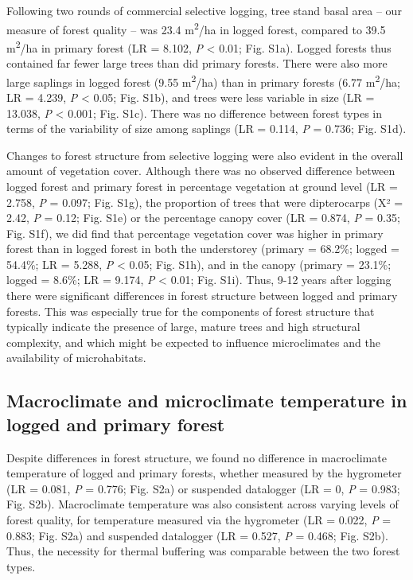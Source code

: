 \documentclass[12pt,a4paper,]{report}
\theoremstyle{definition}
\theoremstyle{definition}
\theoremstyle{definition}
\theoremstyle{remark}
\begin{document}
Following two rounds of commercial selective logging, tree stand basal
area -- our measure of forest quality -- was 23.4
m\textsuperscript{2}/ha in logged forest, compared to 39.5
m\textsuperscript{2}/ha in primary forest (LR = 8.102, \emph{P}
\textless{} 0.01; Fig. S1a). Logged forests thus contained far fewer
large trees than did primary forests. There were also more large
saplings in logged forest (9.55 m\textsuperscript{2}/ha) than in primary
forests (6.77 m\textsuperscript{2}/ha; LR = 4.239, \emph{P} \textless{}
0.05; Fig. S1b), and trees were less variable in size (LR = 13.038,
\emph{P} \textless{} 0.001; Fig. S1c). There was no difference between
forest types in terms of the variability of size among saplings (LR =
0.114, \emph{P} = 0.736; Fig. S1d).

Changes to forest structure from selective logging were also evident in
the overall amount of vegetation cover. Although there was no observed
difference between logged forest and primary forest in percentage
vegetation at ground level (LR = 2.758, \emph{P} = 0.097; Fig. S1g), the
proportion of trees that were dipterocarps (Χ² = 2.42, \emph{P} = 0.12;
Fig. S1e) or the percentage canopy cover (LR = 0.874, \emph{P} = 0.35;
Fig. S1f), we did find that percentage vegetation cover was higher in
primary forest than in logged forest in both the understorey (primary =
68.2\%; logged = 54.4\%; LR = 5.288, \emph{P} \textless{} 0.05; Fig.
S1h), and in the canopy (primary = 23.1\%; logged = 8.6\%; LR = 9.174,
\emph{P} \textless{} 0.01; Fig. S1i). Thus, 9-12 years after logging
there were significant differences in forest structure between logged
and primary forests. This was especially true for the components of
forest structure that typically indicate the presence of large, mature
trees and high structural complexity, and which might be expected to
influence microclimates and the availability of microhabitats.

\subsection{Macroclimate and microclimate temperature in logged and
primary
forest}\label{macroclimate-and-microclimate-temperature-in-logged-and-primary-forest}

Despite differences in forest structure, we found no difference in
macroclimate temperature of logged and primary forests, whether measured
by the hygrometer (LR = 0.081, \emph{P} = 0.776; Fig. S2a) or suspended
datalogger (LR = 0, \emph{P} = 0.983; Fig. S2b). Macroclimate
temperature was also consistent across varying levels of forest quality,
for temperature measured via the hygrometer (LR = 0.022, \emph{P} =
0.883; Fig. S2a) and suspended datalogger (LR = 0.527, \emph{P} = 0.468;
Fig. S2b). Thus, the necessity for thermal buffering was comparable
between the two forest types.
\end{document}
